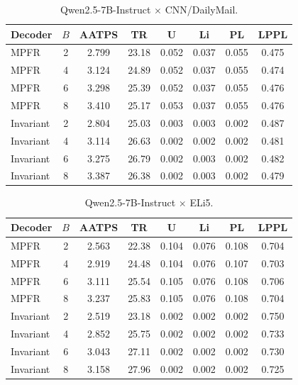 \documentclass{article}
\theoremstyle{plain}
\theoremstyle{definition}
\begin{document}
\begin{table}[h]
\centering
\small
\caption{Qwen2.5-7B-Instruct $\times$ CNN/DailyMail.}
\label{tab:full-qwen-cnn}
\begin{tabular}{l c c c c c c c}
\toprule
Decoder & $B$ & AATPS & TR & U & Li & PL & LPPL \\
\midrule
MPFR      & 2 & 2.799 & 23.18 & 0.052 & 0.037 & 0.055 & 0.475 \\
MPFR      & 4 & 3.124 & 24.89 & 0.052 & 0.037 & 0.055 & 0.474 \\
MPFR      & 6 & 3.298 & 25.39 & 0.052 & 0.037 & 0.055 & 0.476 \\
MPFR      & 8 & 3.410 & 25.17 & 0.053 & 0.037 & 0.055 & 0.476 \\
Invariant & 2 & 2.804 & 25.03 & 0.003 & 0.003 & 0.002 & 0.487 \\
Invariant & 4 & 3.114 & 26.63 & 0.002 & 0.002 & 0.002 & 0.481 \\
Invariant & 6 & 3.275 & 26.79 & 0.002 & 0.003 & 0.002 & 0.482 \\
Invariant & 8 & 3.387 & 26.38 & 0.002 & 0.003 & 0.002 & 0.479 \\
\bottomrule
\end{tabular}
\end{table}

\begin{table}[h]
\centering
\small
\caption{Qwen2.5-7B-Instruct $\times$ ELi5.}
\label{tab:full-qwen-eli5}
\begin{tabular}{l c c c c c c c}
\toprule
Decoder & $B$ & AATPS & TR & U & Li & PL & LPPL \\
\midrule
MPFR      & 2 & 2.563 & 22.38 & 0.104 & 0.076 & 0.108 & 0.704 \\
MPFR      & 4 & 2.919 & 24.48 & 0.104 & 0.076 & 0.107 & 0.703 \\
MPFR      & 6 & 3.111 & 25.54 & 0.105 & 0.076 & 0.108 & 0.706 \\
MPFR      & 8 & 3.237 & 25.83 & 0.105 & 0.076 & 0.108 & 0.704 \\
Invariant & 2 & 2.519 & 23.18 & 0.002 & 0.002 & 0.002 & 0.750 \\
Invariant & 4 & 2.852 & 25.75 & 0.002 & 0.002 & 0.002 & 0.733 \\
Invariant & 6 & 3.043 & 27.11 & 0.002 & 0.002 & 0.002 & 0.730 \\
Invariant & 8 & 3.158 & 27.96 & 0.002 & 0.002 & 0.002 & 0.725 \\
\bottomrule
\end{tabular}
\end{table}
\end{document}
